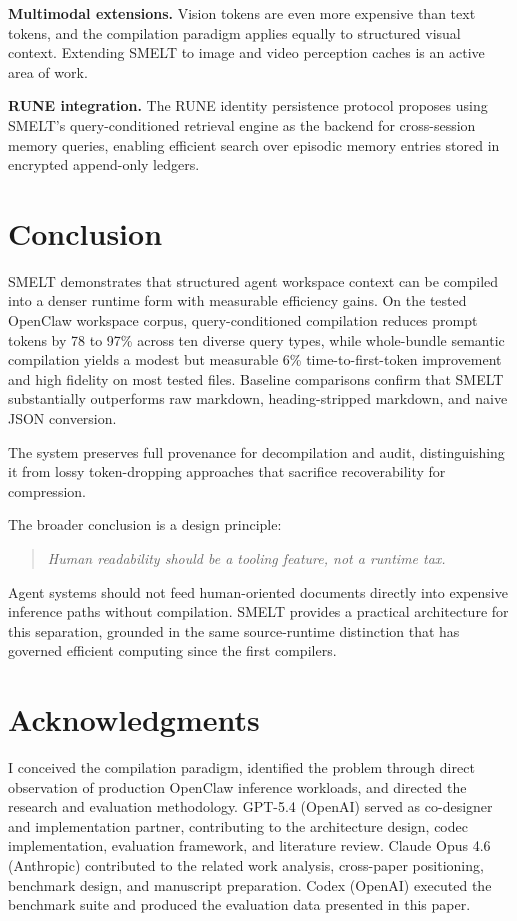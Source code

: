 \documentclass[11pt,a4paper]{article}
\begin{document}
\textbf{Multimodal extensions.} Vision tokens are even more expensive than text tokens, and the compilation paradigm applies equally to structured visual context. Extending SMELT to image and video perception caches is an active area of work.

\textbf{RUNE integration.} The RUNE identity persistence protocol \citep{lister2026rune} proposes using SMELT's query-conditioned retrieval engine as the backend for cross-session memory queries, enabling efficient search over episodic memory entries stored in encrypted append-only ledgers.

\section{Conclusion}

SMELT demonstrates that structured agent workspace context can be compiled into a denser runtime form with measurable efficiency gains. On the tested OpenClaw workspace corpus, query-conditioned compilation reduces prompt tokens by 78 to 97\% across ten diverse query types, while whole-bundle semantic compilation yields a modest but measurable 6\% time-to-first-token improvement and high fidelity on most tested files. Baseline comparisons confirm that SMELT substantially outperforms raw markdown, heading-stripped markdown, and naive JSON conversion.

The system preserves full provenance for decompilation and audit, distinguishing it from lossy token-dropping approaches that sacrifice recoverability for compression.

The broader conclusion is a design principle:

\begin{quote}
\textit{Human readability should be a tooling feature, not a runtime tax.}
\end{quote}

Agent systems should not feed human-oriented documents directly into expensive inference paths without compilation. SMELT provides a practical architecture for this separation, grounded in the same source-runtime distinction that has governed efficient computing since the first compilers.

\section*{Acknowledgments}

I conceived the compilation paradigm, identified the problem through direct observation of production OpenClaw inference workloads, and directed the research and evaluation methodology. GPT-5.4 (OpenAI) served as co-designer and implementation partner, contributing to the architecture design, codec implementation, evaluation framework, and literature review. Claude Opus 4.6 (Anthropic) contributed to the related work analysis, cross-paper positioning, benchmark design, and manuscript preparation. Codex (OpenAI) executed the benchmark suite and produced the evaluation data presented in this paper.
\end{document}

